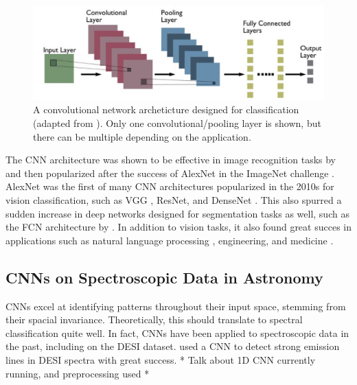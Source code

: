 \begin{figure}[t]
    \centering
    \includegraphics[width=.8\linewidth]{figures/Typical-CNN-architecture.png}
    \caption[Traditional CNN Architecture for Classification]{A convolutional network archeticture designed for classification (adapted from \cite{kumar2022_cnn}). Only
    one convolutional/pooling layer is shown, but there can be multiple depending on the application. }
    \label{fig:CNN}
\end{figure}


The CNN architecture was shown to be effective in image recognition tasks by
\textcite{lecun2004} and then popularized after the success of AlexNet in the 
ImageNet challenge \textcite{krizhevsky2012}. AlexNet was the first of many CNN 
architectures popularized in the 2010s for vision classification, such as VGG \parencite{Simonyan15}, 
ResNet\parencite{he2016deep}, and DenseNet \parencite{Huang2016}. This also spurred a sudden increase in deep networks designed 
for segmentation tasks as well, such as the FCN architecture by \textcite{Shelhamer2016}. In addition to vision tasks, it also found 
great succes in applications such as natural language processing \parencite{Kim2014}, engineering, and 
medicine \parencite{Kiranyaz2021}. 

\subsection{CNNs on Spectroscopic Data in Astronomy}
\label{sec:CNNspectra}
CNNs excel at identifying patterns throughout their input space, stemming from their spacial invariance. 
Theoretically, this should translate to spectral classification quite well. In fact, CNNs have been applied 
to spectroscopic data in the past, including on the DESI dataset. 
\textcite{parks2018} used a CNN to detect strong emission lines in DESI spectra with 
great success. * Talk about 1D CNN currently running, and preprocessing used *

